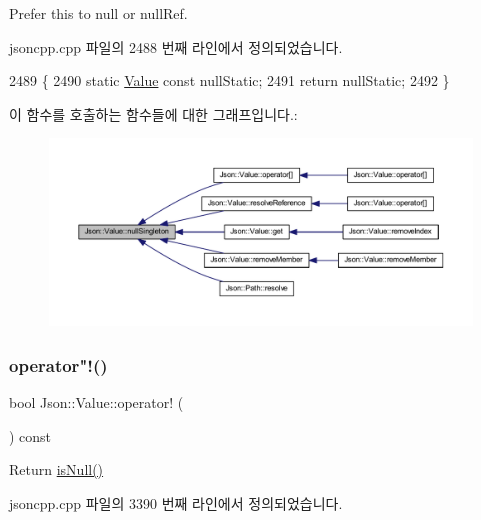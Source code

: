 Prefer this to null or null\+Ref. 



jsoncpp.\+cpp 파일의 2488 번째 라인에서 정의되었습니다.


\begin{DoxyCode}
2489 \{
2490  \textcolor{keyword}{static} \hyperlink{class_json_1_1_value}{Value} \textcolor{keyword}{const} nullStatic;
2491  \textcolor{keywordflow}{return} nullStatic;
2492 \}
\end{DoxyCode}
이 함수를 호출하는 함수들에 대한 그래프입니다.\+:\nopagebreak
\begin{figure}[H]
\begin{center}
\leavevmode
\includegraphics[width=350pt]{class_json_1_1_value_af2f124567acc35d021a424e53ebdfcab_icgraph}
\end{center}
\end{figure}
\mbox{\label{class_json_1_1_value_a731b89fb4764c39ce2328e1707c822b9}} 
\subsubsection{\texorpdfstring{operator"!()}{operator!()}}
{\footnotesize\ttfamily bool Json\+::\+Value\+::operator! (\begin{DoxyParamCaption}{ }\end{DoxyParamCaption}) const}



Return \hyperlink{class_json_1_1_value_abde4070e21e46dc4f8203f66582cb19f}{is\+Null()} 



jsoncpp.\+cpp 파일의 3390 번째 라인에서 정의되었습니다.


